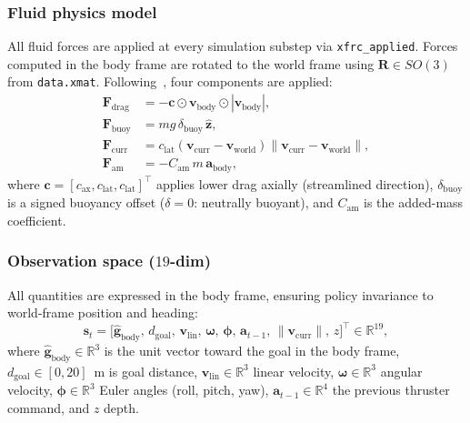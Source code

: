 \documentclass[letterpaper,10pt,journal]{IEEEtran}
\begin{document}
\subsubsection*{Fluid physics model}
All fluid forces are applied at every simulation substep via
\texttt{xfrc\_applied}.
Forces computed in the body frame are rotated to the world frame using
$\mathbf{R}\in SO(3)$ from \texttt{data.xmat}.
Following~\citet{fossen2011}, four components are applied:
%
\begin{align}
  \mathbf{F}_\mathrm{drag}
    &= -\mathbf{c}\odot\mathbf{v}_\mathrm{body}\odot
       |\mathbf{v}_\mathrm{body}|,
    \label{eq:drag}\\
  \mathbf{F}_\mathrm{buoy}
    &= m g\,\delta_\mathrm{buoy}\,\hat{\mathbf{z}},
    \label{eq:buoy}\\
  \mathbf{F}_\mathrm{curr}
    &= c_\mathrm{lat}
       (\mathbf{v}_\mathrm{curr}-\mathbf{v}_\mathrm{world})
       \|\mathbf{v}_\mathrm{curr}-\mathbf{v}_\mathrm{world}\|,
    \label{eq:curr}\\
  \mathbf{F}_\mathrm{am}
    &= -C_\mathrm{am}\,m\,\mathbf{a}_\mathrm{body},
    \label{eq:addedmass}
\end{align}
%
where $\mathbf{c}=[c_\mathrm{ax},c_\mathrm{lat},c_\mathrm{lat}]^\top$
applies lower drag axially (streamlined direction), $\delta_\mathrm{buoy}$
is a signed buoyancy offset ($\delta=0$: neutrally buoyant), and
$C_\mathrm{am}$ is the added-mass coefficient.

\subsubsection*{Observation space ($19$-dim)}
All quantities are expressed in the body frame, ensuring policy
invariance to world-frame position and heading:
\begin{equation}
  \mathbf{s}_t = \bigl[
    \hat{\mathbf{g}}_\mathrm{body},\,
    d_\mathrm{goal},\,
    \mathbf{v}_\mathrm{lin},\,
    \boldsymbol{\omega},\,
    \boldsymbol{\phi},\,
    \mathbf{a}_{t-1},\,
    \|\mathbf{v}_\mathrm{curr}\|,\,
    z
  \bigr]^\top\in\mathbb{R}^{19},
  \label{eq:obs}
\end{equation}
where $\hat{\mathbf{g}}_\mathrm{body}\in\mathbb{R}^3$ is the unit vector
toward the goal in the body frame, $d_\mathrm{goal}\in[0,20]$~m is goal
distance, $\mathbf{v}_\mathrm{lin}\in\mathbb{R}^3$ linear velocity,
$\boldsymbol{\omega}\in\mathbb{R}^3$ angular velocity,
$\boldsymbol{\phi}\in\mathbb{R}^3$ Euler angles (roll, pitch, yaw),
$\mathbf{a}_{t-1}\in\mathbb{R}^4$ the previous thruster command,
and $z$ depth.
\end{document}
